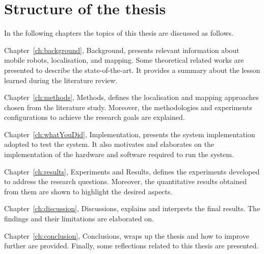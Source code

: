 \section{Structure of the thesis}
\noindent In the following chapters the topics of this thesis are discussed as follows.


Chapter~\ref{ch:background}, Background, presents relevant information about mobile robots, localisation, and mapping.
Some theoretical related works are presented to describe the state-of-the-art.
It provides a summary about the lesson learned during the literature review.

Chapter~\ref{ch:methods}, Methods, defines the localisation and mapping approaches chosen from the literature study.
Moreover, the methodologies and experiments configurations to achieve the research goals are explained.

Chapter~\ref{ch:whatYouDid}, Implementation, presents the system implementation adopted to test the system.
It also motivates and elaborates on the implementation of the hardware and software required to run the system.

Chapter~\ref{ch:results}, Experiments and Results, defines the experiments developed to address the research questions.
Moreover, the quantitative results obtained from them are shown to highlight the desired aspects.

Chapter~\ref{ch:discussion}, Discussions, explains and interprets the final results.
The findings and their limitations are elaborated on.

Chapter~\ref{ch:conclusion}, Conclusions, wraps up the thesis and  how to improve further are provided.
Finally, some reflections related to this thesis are presented.


\cleardoublepage
